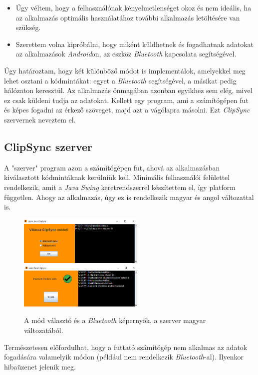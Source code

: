 \documentclass[12pt,a4paper]{article}
\begin{document}
	\begin{itemize}
		\item Úgy véltem, hogy a felhasználónak kényelmetlenséget okoz és nem ideális, ha az alkalmazás optimális használatához további alkalmazás letöltésére van szükség.
		\item Szerettem volna kipróbálni, hogy miként küldhetnek és fogadhatnak adatokat az alkalmazások \textit{Android}on, az eszköz \textit{Bluetooth} kapcsolata segítségével.
	\end{itemize} 
	
	Úgy határoztam, hogy két különböző módot is implementálok, amelyekkel meg lehet osztani a kódmintákat: egyet a \textit{Bluetooth} segítségével, a másikat pedig hálózaton keresztül. Az alkalmazás önmagában azonban egyikhez sem elég, mivel ez csak küldeni tudja az adatokat. Kellett egy program, ami a számítógépen fut és képes fogadni az érkező szöveget, majd azt a vágólapra másolni. Ezt \textit{ClipSync} szervernek neveztem el.
	
	\subsection{ClipSync szerver}
	
	A "szerver" program azon a számítógépen fut, ahová az alkalmazásban kiválasztott kódmintáknak kerülniük kell. Minimális felhasználói felülettel rendelkezik, amit a \textit{Java Swing} keretrendszerrel készítettem el, így platform független. Ahogy az alkalmazás, úgy ez is rendelkezik magyar és angol változattal is.
	
	\begin{figure}[h!]
		\includegraphics[width=6cm]{clipsync_server_select}\hfill
		\includegraphics[width=6cm]{clipsync_server_bluetooth}
		\caption{A mód választó és a \textit{Bluetooth} képernyők, a szerver magyar változatából.}
	\end{figure}

	Természetesen előfordulhat, hogy a futtató számítógép nem alkalmas az adatok fogadására valamelyik módon (például nem rendelkezik \textit{Bluetooth}-al). Ilyenkor hibaüzenet jelenik meg.
	
\end{document}
